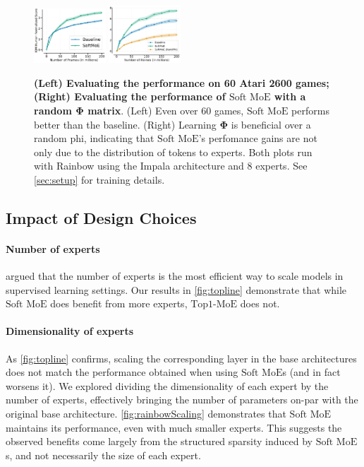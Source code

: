 \documentclass{article}
\theoremstyle{plain}
\theoremstyle{definition}
\theoremstyle{remark}
\newcommand{\moe}{$\textrm{Top1-MoE}$}
\newcommand{\softmoe}{$\textrm{Soft MoE}$}
\begin{document}
\ifarxiv
    \begin{figure}[!t]
        \centering
        \includegraphics[width=0.24\textwidth]{figures/MOES_all_suite_resumenCORRCOLOR.pdf}%
        \includegraphics[width=0.24\textwidth]{figures/randPhi.pdf}%
        \vspace{-0.4cm}
        \caption{\textbf{(Left) Evaluating the performance on 60 Atari 2600 games; (Right) Evaluating the performance of \softmoe{} with a random $\boldsymbol{\Phi}$ matrix}. (Left) Even over 60 games, \softmoe{} performs better than the baseline. (Right) Learning $\boldsymbol{\Phi}$ is beneficial over a random phi, indicating that \softmoe{}'s perfomance gains are not only due to the distribution of tokens to experts. Both plots run with Rainbow using the Impala architecture and 8 experts. See \cref{sec:setup} for training details.}
        \label{fig:allsuite}
        \vspace{-0.2cm}
    \end{figure}
\fi


\subsection{Impact of Design Choices}
\label{sec:impactDesign}
\paragraph{Number of experts} \citet{fedus2022switch} argued that the number of experts is the most efficient way to scale models in supervised learning settings. Our results in \cref{fig:topline} demonstrate that while \softmoe{} does benefit from more experts, \moe{} does not. 

\paragraph{Dimensionality of experts} As \cref{fig:topline} confirms, scaling the corresponding layer in the base architectures does not match the performance obtained when using \softmoe{}s (and in fact worsens it). We explored dividing the dimensionality of each expert by the number of experts, effectively bringing the number of parameters on-par with the original base architecture. \cref{fig:rainbowScaling} demonstrates that \softmoe{} maintains its performance, even with much smaller experts. This suggests the observed benefits come largely from the structured sparsity induced by \softmoe{}s, and not necessarily the size of each expert.
\end{document}
